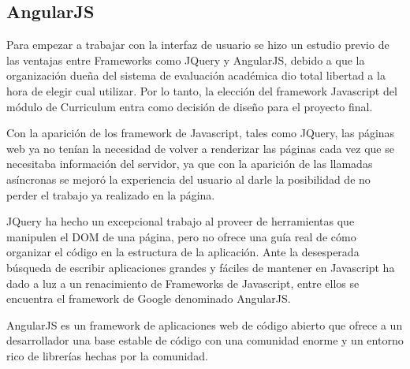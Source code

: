 \subsection{AngularJS}
Para empezar a trabajar con la interfaz de usuario se hizo un estudio previo de las ventajas entre Frameworks como JQuery y AngularJS, debido a que la organización dueña del sistema de evaluación académica dio total libertad a la hora de elegir cual utilizar. Por lo tanto, la elección del framework Javascript del módulo de Curriculum entra como decisión de diseño para el proyecto final.

Con la aparición de los framework de Javascript, tales como JQuery, las páginas web ya no tenían la necesidad de volver a renderizar las páginas cada vez que se necesitaba información del servidor, ya que con la aparición de las llamadas asíncronas se mejoró la experiencia del usuario al darle la posibilidad de no perder el trabajo ya realizado en la página.

JQuery ha hecho un excepcional trabajo al proveer de herramientas que manipulen el DOM de una página, pero no ofrece una guía real de cómo organizar el código en la estructura de la aplicación. Ante la desesperada búsqueda de escribir aplicaciones grandes y fáciles de mantener en Javascript ha dado a luz a un renacimiento de Frameworks de Javascript, entre ellos se encuentra el framework de Google denominado AngularJS.

AngularJS es un framework de aplicaciones web de código abierto que ofrece a un desarrollador una base estable de código con una comunidad enorme y un entorno rico de librerías hechas por la comunidad.